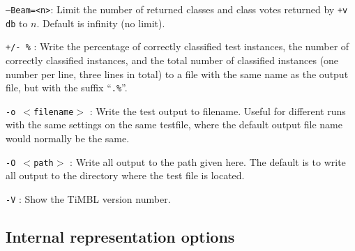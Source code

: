 \documentclass{report}
\begin{document}
\begin{description}
\item {\tt --Beam=<n>}: Limit the number of returned classes and class
  votes returned by {\tt +v db} to $n$. Default is infinity (no limit).

\item {\tt +/- \%} : Write the percentage of correctly classified test
  instances, the number of correctly classified instances, and the
  total number of classified instances (one number per line, three
  lines in total) to a file with the same name as the output file, but
  with the suffix ``{\tt .\%}''.

\item {\tt -o $<$filename$>$} : Write the test output to filename. Useful
  for different runs with the same settings on the same testfile,
  where the default output file name would normally be the same.

\item {\tt -O $<$path$>$} : Write all output to the path given here. The
  default is to write all output to the directory where the test file
  is located.

\item {\tt -V} : Show the TiMBL version number.

\end{description}

\subsection{Internal representation options}
\end{document}
